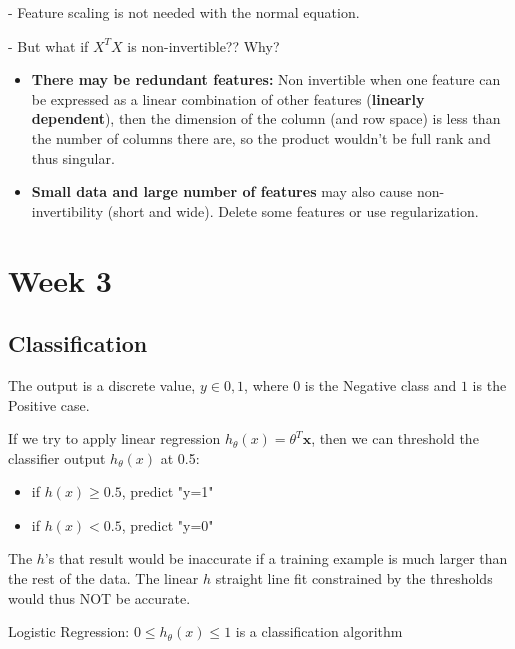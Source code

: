 \documentclass{article}
\begin{document}
- Feature scaling is not needed with the normal equation.

\hspace{}

- But what if $X^T X$ is non-invertible?? Why?


\begin{itemize}
\item \textbf{There may be redundant features:}
 Non invertible when one feature can be expressed as a linear combination of other features (\textbf{linearly dependent}), then the dimension of the column (and row space) is less than the number of columns there are, so the product wouldn't be full rank and thus singular.
\item \textbf{Small data and large number of features} may also cause non-invertibility (short and wide). Delete some features or use regularization.
\end{itemize}



\section{Week 3}

\subsection{Classification}


The output is a discrete value, $y \in {0, 1}$, where $0$ is the Negative class and $1$ is the Positive case.


\begin{myboxr}
If we try to apply linear regression $h_{\theta} (x) = \theta^T \textbf{x}$, then we can threshold the classifier output $h_{\theta} (x)$ at 0.5:

\begin{itemize}
    \item if $h(x) \geq 0.5$, predict "y=1"
    \item if $h(x) < 0.5$, predict "y=0"
\end{itemize}

The $h$'s that result would be inaccurate if a training example is much larger than the rest of the data. The linear $h$ straight line fit constrained by the thresholds would thus NOT be accurate. 

\end{myboxr}


Logistic Regression: $0 \leq h_{\theta} (x) \leq 1$ is a classification algorithm
\end{document}
